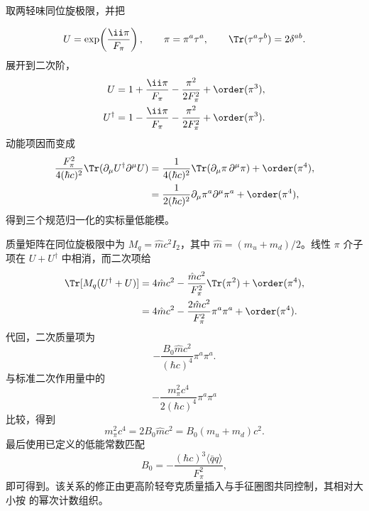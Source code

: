 \begin{derivation}
取两轻味同位旋极限，并把

\begin{equation*}
 U=\exp\!\left(\frac{\ii\pi}{F_\pi}\right),
 \qquad
 \pi=\pi^a\tau^a,
 \qquad
 \Tr(\tau^a\tau^b)=2\delta^{ab}.
\end{equation*}
展开到二次阶，
\begin{align*}
 U&=1+\frac{\ii\pi}{F_\pi}-\frac{\pi^2}{2F_\pi^2}+\order(\pi^3),\\
 U^\dagger&=1-\frac{\ii\pi}{F_\pi}-\frac{\pi^2}{2F_\pi^2}+\order(\pi^3).
\end{align*}
动能项因而变成
\begin{align*}
 \frac{F_\pi^2}{4(\hbar c)^2}
 \Tr(\partial_\mu U^\dagger\partial^\mu U)
 &=\frac1{4(\hbar c)^2}
 \Tr(\partial_\mu\pi\,\partial^\mu\pi)+\order(\pi^4),\\
 &=\frac1{2(\hbar c)^2}
 \partial_\mu\pi^a\partial^\mu\pi^a+\order(\pi^4),
\end{align*}
得到三个规范归一化的实标量低能模。

质量矩阵在同位旋极限中为 $M_q=\hat m c^2 I_2$，其中 $\hat m=(m_u+m_d)/2$。线性 \(\pi\) 介子项在 $U+U^\dagger$ 中相消，而二次项给
\begin{align*}
 \Tr[M_q(U^\dagger+U)]
 &=4\hat m c^2
 -\frac{\hat m c^2}{F_\pi^2}\Tr(\pi^2)+\order(\pi^4),\\
 &=4\hat m c^2
 -\frac{2\hat m c^2}{F_\pi^2}\pi^a\pi^a+\order(\pi^4).
\end{align*}
代回，二次质量项为
\begin{equation*}
 -\frac{B_0\hat m c^2}{(\hbar c)^4}\pi^a\pi^a.
\end{equation*}
与标准二次作用量中的
\begin{equation*}
 -\frac{m_\pi^2c^4}{2(\hbar c)^4}\pi^a\pi^a
\end{equation*}
比较，得到
\begin{equation*}
 m_\pi^2c^4=2B_0\hat m c^2=B_0(m_u+m_d)c^2.
\end{equation*}
最后使用已定义的低能常数匹配
\begin{equation*}
 B_0=-\frac{(\hbar c)^3\langle\bar q q\rangle}{F_\pi^2},
\end{equation*}
即可得到。该关系的修正由更高阶轻夸克质量插入与手征圈图共同控制，其相对大小按 的幂次计数组织。
\end{derivation}

